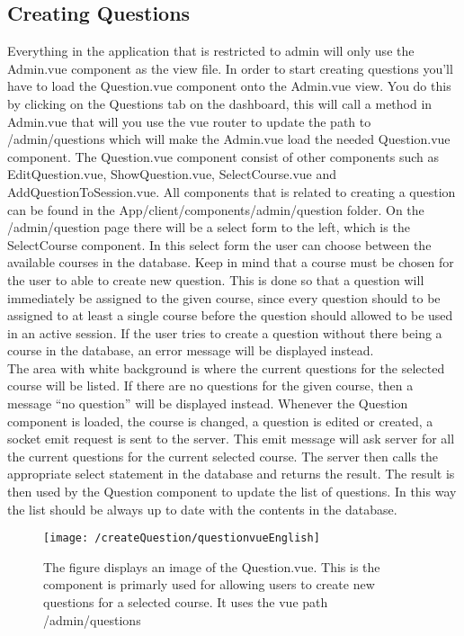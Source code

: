 \subsection{Creating Questions}
Everything in the application that is restricted to admin will only use the Admin.vue component as the view file. In order to start creating questions you’ll have to load the Question.vue component onto the Admin.vue view. You do this by clicking on the Questions tab on the dashboard, this will call a method in Admin.vue that will you use the vue router to update the path to /admin/questions which will make the Admin.vue load the needed Question.vue component. The Question.vue component consist of other components such as EditQuestion.vue, ShowQuestion.vue, SelectCourse.vue and AddQuestionToSession.vue. All components that is related to creating a question can be found in the App/client/components/admin/question folder. On the /admin/question page there will be a select form to the left, which is the SelectCourse component. In this select form the user can choose between the available courses in the database. Keep in mind that a course must be chosen for the user to able to create new question. This is done so that a question will immediately be assigned to the given course, since every question should to be assigned to at least a single course before the question should allowed to be used in an active session.  If the user tries to create a question without there being a course in the database, an error message will be displayed instead.\\[11pt]
The area with white background is where the current questions for the selected course will be listed. If there are no questions for the given course, then a message “no question” will be displayed instead. Whenever the Question component is loaded, the course is changed, a question is edited or created, a socket emit request is sent to the server. This emit message will ask server for all the current questions for the current selected course. The server then calls the appropriate select statement in the database and returns the result. The result is then used by the Question component to update the list of questions. In this way the list should be always up to date with the contents in the database. 
\begin{figure}[H]
	\centering
	\texttt{[image: /createQuestion/questionvueEnglish]}
	\caption{The figure displays an image of the Question.vue. This is the component is primarly used for allowing users to create new questions for a selected course. It uses the vue path /admin/questions}
	\label{fig:questionVue}
\end{figure}
